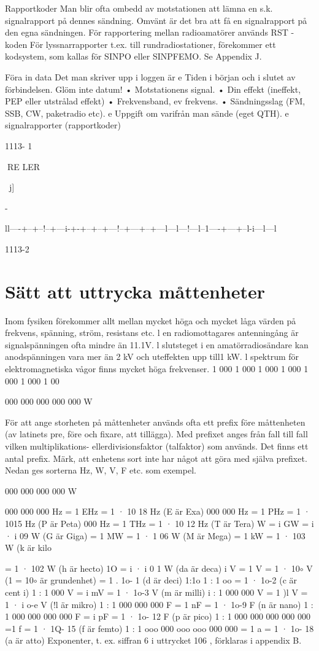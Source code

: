 \documentclass[a4paper,twoside,twocolumn,openright]{book}
\begin{document}
{{{{{Rapportkoder
Man blir ofta ombedd av motstationen att
lämna en s.k. signalrapport på dennes sändning. Omvänt är det bra att få en signalrapport på den egna sändningen.
För rapportering mellan radioamatörer
används RST -koden
För lyssnarrapporter t.ex. till rundradiostationer, förekommer ett kodsystem, som
kallas för SINPO eller SINPFEMO.
Se Appendix J.

Föra in data
Det man skriver upp i loggen är
e
Tiden i början och i slutet av förbindelsen.
Glöm inte datum!
• Motstationens signal.
• Din effekt (ineffekt, PEP eller utstrålad
effekt)
• Frekvensband, ev frekvens.
• Sändningsslag (FM, SSB, CW, paketradio etc).
e
Uppgift om varifrån man sände (eget
QTH).
e
signalrapporter (rapportkoder)

1113- 1

RE LER

~j]

-~~~~~~~~~

ll----+--+--!--+---i-+-+--+--+---!--+---+--+---l---l---!---l--1----+---+--l-i---l---l

1113-2

\appendix

\chapter{Sätt att uttrycka måttenheter}

Inom fysiken förekommer allt mellan
mycket höga och mycket låga värden på
frekvens, spänning, ström, resistans etc.
l en radiomottagares antenningång
är signalspänningen ofta mindre än 11.1V.
l slutsteget i en amatörradiosändare
kan anodspänningen vara mer än 2 kV
och uteffekten upp till1 kW.
l spektrum för elektromagnetiska vågor finns mycket höga frekvenser.
1 000
1 000
1 000
1 000
1 000
1 000
1 00

000
000
000
000
000
W

För att ange storheten på måttenheter används ofta ett prefix före måttenheten (av latinets pre, före och fixare,
att tillägga). Med prefixet anges från fall
till fall vilken multiplikations- ellerdivisionsfaktor (talfaktor) som används. Det finns
ett antal prefix.
Märk, att enhetens sort inte har något
att göra med själva prefixet. Nedan ges
sorterna Hz, W, V, F etc. som exempel.

000
000
000
000
W

000 000 000 Hz = 1 EHz = 1 · 10 18 Hz (E är Exa)
000 000 Hz
= 1 PHz = 1 · 1015 Hz (P är Peta)
000 Hz
= 1 THz = 1 · 10 12 Hz (T är Tera)
W
= i GW = i · i 09 W (G är Giga)
= 1 MW = 1 · 1 06 W (M är Mega)
= 1 kW = 1 · 103 W (k är kilo}
= 1 · 102 W (h är hecto)
1O
= i · i 0 1 W (da är deca)
i V
= 1 V = 1 · 10$\circ$ V (1 = 10$\circ$ är grundenhet)
= 1 . 1o- 1
(d är deci)
1:1o
1 : 1 oo
= 1 · 1o-2
(c är cent i)
1 : 1 000 V
= i mV = 1 · 1o-3 V (m är milli)
i : 1 000 000 V
= 1 )l V = 1 · i o-e V (!l är mikro)
1 : 1 000 000 000 F
= 1 nF = 1 · 1o-9 F (n är nano)
1 : 1 000 000 000 000 F
= i pF = 1 · 1o- 12 F (p är pico)
1 : 1 000 000 000 000 000
=1 f
= 1 · 1Q- 15
(f är femto)
1 : 1 ooo 000 ooo ooo 000 000 = 1 a
= 1 · 1o- 18
(a är atto)
Exponenter, t. ex. siffran 6 i uttrycket 106 , förklaras i appendix B.

}}}}
\end{document}
